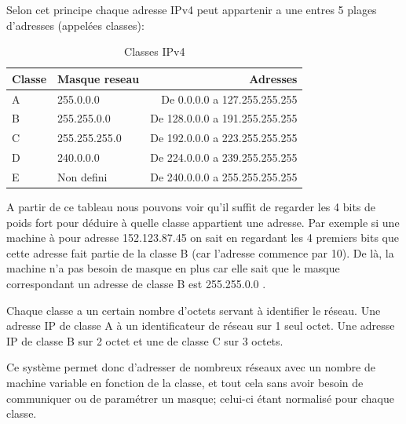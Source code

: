 Selon cet principe chaque adresse IPv4 peut appartenir a une entres 5 plages
d'adresses (appelées classes):

\begin{table}[h]
  \centering
  \begin{tabular}{| p{5cm} | p{5cm} | r |}
    \hline
    \textbf{Classe} & \textbf{Masque reseau} & \textbf{Adresses}\\
    \hline
    A & 255.0.0.0 & De 0.0.0.0 a 127.255.255.255\\
    \hline
    B & 255.255.0.0 & De 128.0.0.0 a 191.255.255.255\\
    \hline
    C & 255.255.255.0 & De 192.0.0.0 a 223.255.255.255\\
    \hline
    D & 240.0.0.0 & De 224.0.0.0 a 239.255.255.255\\
    \hline
    E & Non defini & De 240.0.0.0 a 255.255.255.255\\
    \hline
  \end{tabular}
  \caption{Classes IPv4}
  \label{tab:classes}
\end{table}

A partir de ce tableau nous pouvons voir qu'il suffit de regarder les 4 bits de
poids fort pour déduire à quelle classe appartient une adresse.  Par exemple si
une machine à pour adresse 152.123.87.45 on sait en regardant les 4 premiers
bits que cette adresse fait partie de la classe B (car l'adresse commence par
10). De là, la machine n'a pas besoin de masque en plus car elle sait que le
masque correspondant un adresse de classe B est 255.255.0.0 .

Chaque classe a un certain nombre d'octets servant à identifier le réseau. Une
adresse IP de classe A à un identificateur de réseau sur 1 seul octet. Une
adresse IP de classe B sur 2 octet et une de classe C sur 3 octets.

Ce système permet donc d'adresser de nombreux réseaux avec un nombre de machine
variable en fonction de la classe, et tout cela sans avoir besoin de
communiquer ou de paramétrer un masque; celui-ci étant normalisé pour chaque
classe.  

